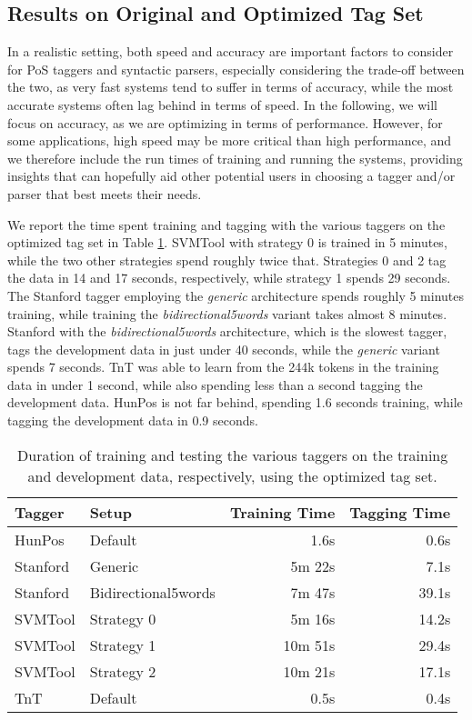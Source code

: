 \documentclass[a4paper,12pt,english]{book}
\begin{document}
\subsection{Results on Original and Optimized Tag Set}
In a realistic setting, both speed and accuracy are important factors to
consider for PoS taggers and syntactic parsers, especially considering the
trade-off between the two, as very fast systems tend to suffer in terms of
accuracy, while the most accurate systems often lag behind in terms of speed.
In the following, we will focus on accuracy, as we are optimizing in terms of
performance. However, for some applications, high speed may be more critical
than high performance, and we therefore include the run times of training and
running the systems, providing insights that can hopefully aid other potential
users in choosing a tagger and/or parser that best meets their needs.

We report the time spent training and tagging with the various taggers on the
optimized tag set in Table \ref{taggertimeeval}. SVMTool with strategy 0 is
trained in 5 minutes, while the two other strategies spend roughly twice that.
Strategies 0 and 2 tag the data in 14 and 17 seconds, respectively, while
strategy 1 spends 29 seconds. The Stanford tagger employing the \emph{generic}
architecture spends roughly 5 minutes training, while training the
\emph{bidirectional5words} variant takes almost 8 minutes. Stanford with the
\emph{bidirectional5words} architecture, which is the slowest tagger, tags the
development data in just under 40 seconds, while the \emph{generic} variant
spends 7 seconds. TnT was able to learn from the 244k tokens in the training
data in under 1 second, while also spending less than a second tagging the
development data. HunPos is not far behind, spending 1.6 seconds training,
while tagging the development data in 0.9 seconds.

\begin{table}
    \centering
    \smaller[0.5]
    \begin{tabular}{@{}llrr@{}}
        \toprule
        \textbf{Tagger} & \textbf{Setup} & \textbf{Training Time} &
        \textbf{Tagging Time} \\
        \midrule
        HunPos & Default & 1.6s & 0.6s \\
        Stanford & Generic & 5m 22s & 7.1s \\
        Stanford & Bidirectional5words & 7m 47s & 39.1s \\
        SVMTool & Strategy 0 & 5m 16s & 14.2s \\
        SVMTool & Strategy 1 & 10m 51s & 29.4s \\
        SVMTool & Strategy 2 & 10m 21s & 17.1s \\
        TnT & Default & 0.5s & 0.4s \\
        \bottomrule
    \end{tabular}
    \caption{Duration of training and testing the various taggers on the
        training and development data, respectively, using the optimized tag
        set.}
    \label{taggertimeeval}
\end{table}
\end{document}
